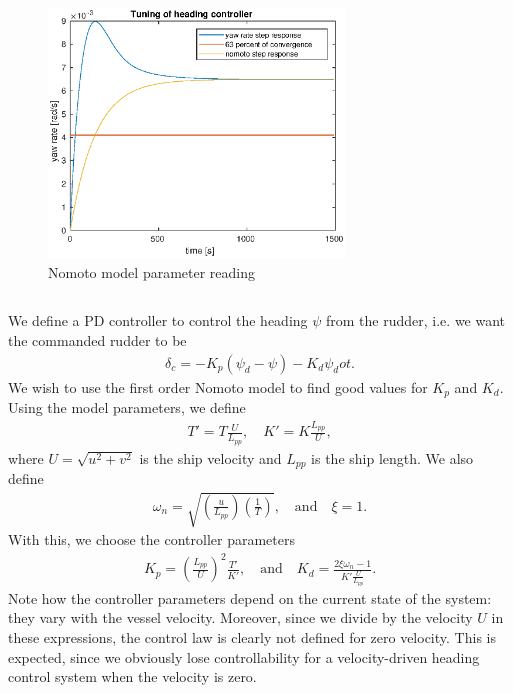 \begin{figure}[H]
\centering
\includegraphics[width=0.7\textwidth]{nomoto-reading-improved}
\caption{Nomoto model parameter reading}
\label{fig:nomoto_reading}
\end{figure}


\subsection{}
We define a PD controller to control the heading $\psi$ from the rudder, i.e. we want the commanded rudder to be
\begin{equation}\begin{aligned}
\delta_c = -K_p (\psi_d - \psi) - K_d \psi_dot.
\end{aligned}\end{equation}
We wish to use the first order Nomoto model to find good values for $K_p$ and $K_d$. Using the model parameters, we define
\begin{equation}\begin{aligned}
T' = T \frac{U}{L_{pp}}, \quad K' = K \frac{L_{pp}}{U},
\end{aligned}\end{equation}
where $U = \sqrt{u^2 + v^2}$ is the ship velocity and $L_{pp}$ is the ship length. We also define
\begin{equation}\begin{aligned}
\omega_n = \sqrt{(\frac{u}{L_{pp}}) (\frac{1}{T})}, \quad \text{and} \quad \xi = 1.
\end{aligned}\end{equation}
With this, we choose the controller parameters
\begin{equation}\begin{aligned}
K_p = (\frac{L_{pp}}{U})^2 \frac{T'}{K'}, \quad \text{and} \quad
K_d = \frac{2 \xi \omega_n - 1}{K' \frac{U}{L_{pp}}}.
\end{aligned}\end{equation}
Note how the controller parameters depend on the current state of the system: they vary with the vessel velocity. Moreover, since we divide by the velocity $U$ in these expressions, the control law is clearly not defined for zero velocity. This is expected, since we obviously lose controllability for a velocity-driven heading control system when the velocity is zero.

